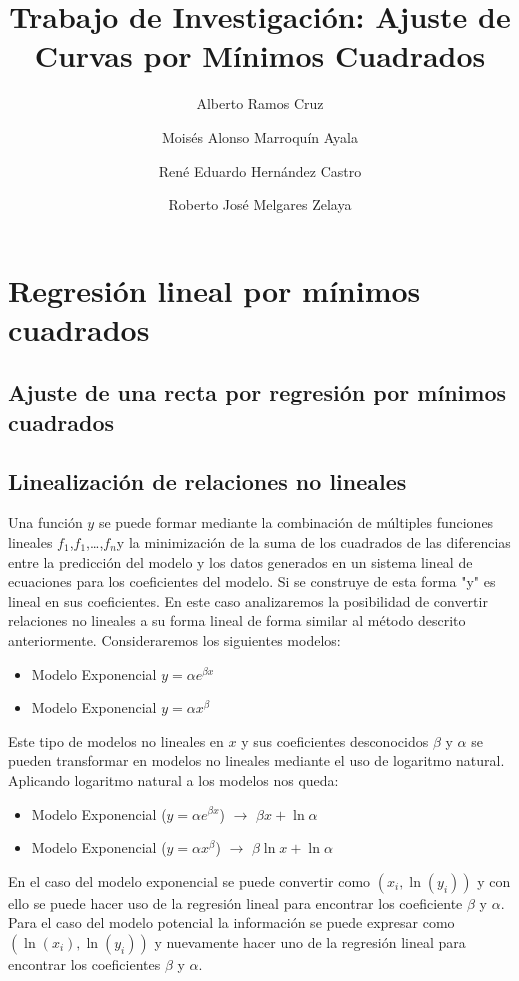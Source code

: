 \documentclass[11pt,letterpaper]{article}
\begin{document}
\title{Trabajo de Investigación: Ajuste de Curvas por Mínimos Cuadrados}

\author{
	Alberto Ramos Cruz
	\and Moisés Alonso Marroquín Ayala
	\and René Eduardo Hernández Castro
	\and Roberto José Melgares Zelaya
}
\maketitle


\section{Regresión lineal por mínimos cuadrados}
\subsection{Ajuste de una recta por regresión por mínimos cuadrados}

\subsection{Linealización de relaciones no lineales}
Una función $y$ se puede formar mediante la combinación de múltiples funciones lineales $f_1$,$f_1$,\dots,$f_n$y la minimización de la suma de los cuadrados de las diferencias entre la predicción del modelo y los datos generados en un sistema lineal de ecuaciones para los coeficientes del modelo. Si se construye de esta forma "y" es lineal en sus coeficientes. En este caso analizaremos la posibilidad de convertir relaciones no lineales a su forma lineal de forma similar al método descrito anteriormente. \cite{ualberta}Consideraremos los siguientes modelos:
\begin{itemize}
	\item Modelo Exponencial $y = \alpha e^{\beta x}$
	\item Modelo Exponencial $y = \alpha x^{\beta}$
\end{itemize}
\par Este tipo de modelos no lineales en $x$ y sus coeficientes desconocidos $\beta$ y $\alpha$ se pueden transformar en modelos no lineales mediante el uso de logaritmo natural. Aplicando logaritmo natural a los modelos nos queda:
\begin{itemize}
	\item Modelo Exponencial ($y = \alpha e^{\beta x}$) $\longrightarrow$ $\beta x + \ln \alpha$
	\item Modelo Exponencial ($y = \alpha x^{\beta}$) $\longrightarrow$ $\beta \ln x + \ln \alpha$
\end{itemize}
\par 
En el caso del modelo exponencial se puede convertir como $(x_i, \ln(y_i))$ y con ello se puede hacer uso de la regresión lineal  para encontrar los coeficiente $\beta$ y $\alpha$. Para el caso del modelo potencial la información se puede expresar como $(\ln(x_i), \ln(y_i))$ y nuevamente hacer uno de la regresión lineal para encontrar los coeficientes $\beta$ y $\alpha$.\cite{nieves2011metodos} \cite{ualberta}
\end{document}
